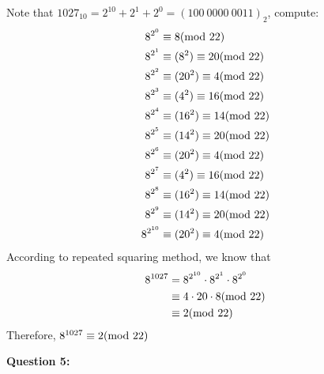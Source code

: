 \documentclass[a4paper,11pt]{article}
\begin{document}
\begin{spacing}{1.4}
    Note that $1027_{10}=2^{10}+2^1+2^0=(100\ 0000\ 0011)_2$,
    compute:
    \begin{align*}
        8^{2^0}&\equiv 8 {\rm (mod\ 22)}\\
        8^{2^1}&\equiv (8^2)\equiv 20 {\rm (mod\ 22)}\\
        8^{2^2}&\equiv (20^2)\equiv 4 {\rm (mod\ 22)}\\
        8^{2^3}&\equiv (4^2)\equiv 16 {\rm (mod\ 22)}\\
        8^{2^4}&\equiv (16^2)\equiv 14 {\rm (mod\ 22)}\\
        8^{2^5}&\equiv (14^2)\equiv 20 {\rm (mod\ 22)}\\
        8^{2^6}&\equiv (20^2)\equiv 4 {\rm (mod\ 22)}\\
        8^{2^7}&\equiv (4^2)\equiv 16 {\rm (mod\ 22)}\\
        8^{2^8}&\equiv (16^2)\equiv 14 {\rm (mod\ 22)}\\
        8^{2^9}&\equiv (14^2)\equiv 20 {\rm (mod\ 22)}\\
        8^{2^{10}}&\equiv (20^2)\equiv 4 {\rm (mod\ 22)}\\
    \end{align*}
    According to repeated squaring method, we know that
    \begin{align*}
        8^{1027}&=8^{2^{10}}\cdot 8^{2^1}\cdot 8^{2^0}\\
        &\equiv 4\cdot 20\cdot 8 {\rm (mod\ 22)}\\
        &\equiv 2 {\rm (mod\ 22)}
    \end{align*}
    Therefore, $8^{1027}\equiv 2 {\rm (mod\ 22)}$
    

    \vspace{20pt}

    \textbf{Question 5:}


\end{spacing}
\end{document}
